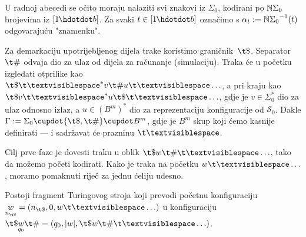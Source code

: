 U radnoj abecedi se očito moraju nalaziti svi znakovi iz $\Sigma_0$, kodirani po ${\mathbb N}\Sigma_0$ brojevima iz $[1\mspace{-1mu}\dd b]$. Za svaki $t\in[1\mspace{-1mu}\dd b]$ označimo s $\alpha_t:={{\mathbb N}\Sigma_0}^{-1}(t)$ odgovarajuću "znamenku".  %

Za demarkaciju upotrijebljenog dijela trake koristimo graničnik~$\t\$$. Separator~$\t\#$ odvaja dio za ulaz od dijela za računanje (simulaciju). Traka će u početku izgledati otprilike kao $\t\$\bl^*v\t\#u\bl\ldots$, a pri kraju kao $\t\$v\bl^*u\t\$\bl\ldots$, gdje je $v\in\Sigma_0^*$ dio za ulaz odnosno izlaz, a $u\in(B^m)^*$ dio za reprezentaciju konfiguracije od $\mathcal S_0$. Dakle
    $\Gamma:=\Sigma_0\dcup\{\t\$,\t\#\}\dcup B^m$,
gdje je $B^m$ skup koji ćemo kasnije definirati --- i sadržavat će prazninu $\bl$.


Cilj prve faze je dovesti traku u oblik $\t\$w\t\#\bl\ldots$, tako da možemo početi kodirati. Kako je traka na početku $w\bl\ldots$, moramo pomaknuti riječ za jednu ćeliju udesno.

\begin{lema}[{name=[prvi fragment transpiliranog stroja]}]\label{lm:faza1}
    Postoji fragment Turingovog stroja koji prevodi početnu konfiguraciju\\ $\underset{n_{\t\$}}{w}=(n_{\t\$},0,w\bl\ldots)$ u konfiguraciju $\t\$\underset{q_0}{w}\t\#=(q_0,\dulj{w},\t\$w\t\#\bl\ldots)$.
\vspace{-6pt}
\end{lema}


